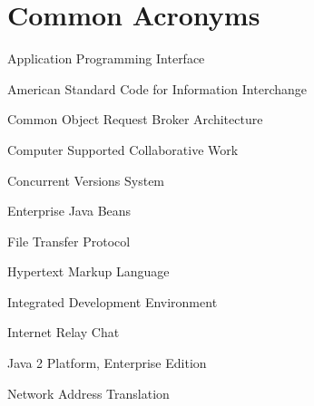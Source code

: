 \chapter{Common Acronyms}\label{acronyms}


\begin{acronym}
  {Application Programming Interface}
\end{acronym}

\begin{acronym}
  {American Standard Code for Information Interchange}
\end{acronym}

\begin{acronym}
  {Common Object Request Broker Architecture}
\end{acronym}

\begin{acronym}
  {Computer Supported Collaborative Work}
\end{acronym}

\begin{acronym}
  {Concurrent Versions System}
\end{acronym}

\begin{acronym}
  {Enterprise Java Beans}
\end{acronym}

\begin{acronym}
  {File Transfer Protocol}
\end{acronym}

\begin{acronym}
  {Hypertext Markup Language}
\end{acronym}

\begin{acronym}
  {Integrated Development Environment}
\end{acronym}

\begin{acronym}
  {Internet Relay Chat}
\end{acronym}

\begin{acronym}
  {Java 2 Platform, Enterprise Edition}
\end{acronym}

\begin{acronym}
  {Network Address Translation}
\end{acronym}

